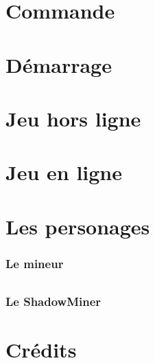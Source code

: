 \documentclass[titlepage, 13px, a4paper]{report}
\begin{document}

\part{Commande} 



\newpage


\part{Démarrage} 



\newpage


\part{Jeu hors ligne} 



\newpage


\part{Jeu en ligne} 



\newpage


\part{Les personages} 

\section{Le mineur}
\paragraph*{} \hspace{0pt}

\section{Le ShadowMiner}
\paragraph*{} \hspace{0pt}


\newpage


\part{Crédits} 


\end{document}
